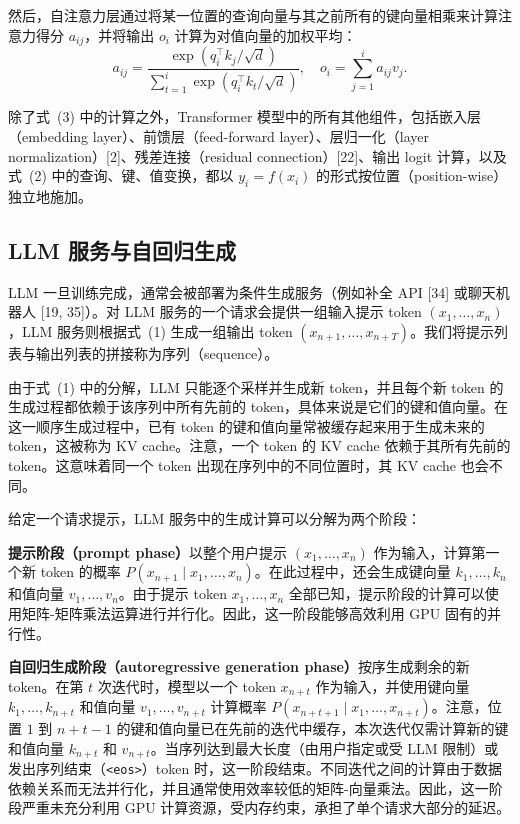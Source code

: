 \documentclass[11pt,UTF8,fontset=fandol]{ctexart}
\begin{document}
然后，自注意力层通过将某一位置的查询向量与其之前所有的键向量相乘来计算注意力得分 $a_{ij}$，并将输出 $o_i$ 计算为对值向量的加权平均：
\begin{equation}
a_{ij} = \frac{\exp(q_i^\top k_j / \sqrt{d})}{\sum_{t=1}^{i} \exp(q_i^\top k_t / \sqrt{d})}, \quad o_i = \sum_{j=1}^{i} a_{ij} v_j. \tag{3}
\end{equation}

除了式~(3) 中的计算之外，Transformer 模型中的所有其他组件，包括嵌入层（embedding layer）、前馈层（feed-forward layer）、层归一化（layer normalization）[2]、残差连接（residual connection）[22]、输出 logit 计算，以及式~(2) 中的查询、键、值变换，都以 $y_i = f(x_i)$ 的形式按位置（position-wise）独立地施加。

\subsection{LLM 服务与自回归生成}

LLM 一旦训练完成，通常会被部署为条件生成服务（例如补全 API [34] 或聊天机器人 [19, 35]）。对 LLM 服务的一个请求会提供一组输入提示 token $(x_1, \ldots, x_n)$，LLM 服务则根据式~(1) 生成一组输出 token $(x_{n+1}, \ldots, x_{n+T})$。我们将提示列表与输出列表的拼接称为序列（sequence）。

由于式~(1) 中的分解，LLM 只能逐个采样并生成新 token，并且每个新 token 的生成过程都依赖于该序列中所有先前的 token，具体来说是它们的键和值向量。在这一顺序生成过程中，已有 token 的键和值向量常被缓存起来用于生成未来的 token，这被称为 KV cache。注意，一个 token 的 KV cache 依赖于其所有先前的 token。这意味着同一个 token 出现在序列中的不同位置时，其 KV cache 也会不同。

给定一个请求提示，LLM 服务中的生成计算可以分解为两个阶段：

\textbf{提示阶段（prompt phase）}以整个用户提示 $(x_1, \ldots, x_n)$ 作为输入，计算第一个新 token 的概率 $P(x_{n+1} \mid x_1, \ldots, x_n)$。在此过程中，还会生成键向量 $k_1, \ldots, k_n$ 和值向量 $v_1, \ldots, v_n$。由于提示 token $x_1, \ldots, x_n$ 全部已知，提示阶段的计算可以使用矩阵-矩阵乘法运算进行并行化。因此，这一阶段能够高效利用 GPU 固有的并行性。

\textbf{自回归生成阶段（autoregressive generation phase）}按序生成剩余的新 token。在第 $t$ 次迭代时，模型以一个 token $x_{n+t}$ 作为输入，并使用键向量 $k_1, \ldots, k_{n+t}$ 和值向量 $v_1, \ldots, v_{n+t}$ 计算概率 $P(x_{n+t+1} \mid x_1, \ldots, x_{n+t})$。注意，位置 $1$ 到 $n + t - 1$ 的键和值向量已在先前的迭代中缓存，本次迭代仅需计算新的键和值向量 $k_{n+t}$ 和 $v_{n+t}$。当序列达到最大长度（由用户指定或受 LLM 限制）或发出序列结束（\texttt{<eos>}）token 时，这一阶段结束。不同迭代之间的计算由于数据依赖关系而无法并行化，并且通常使用效率较低的矩阵-向量乘法。因此，这一阶段严重未充分利用 GPU 计算资源，受内存约束，承担了单个请求大部分的延迟。
\end{document}
